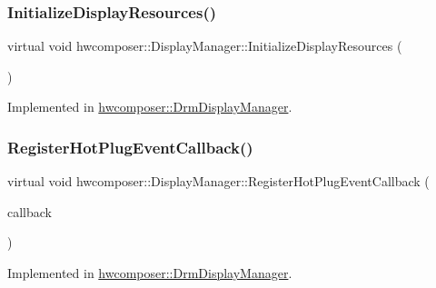 \subsubsection{\texorpdfstring{Initialize\+Display\+Resources()}{InitializeDisplayResources()}}
{\footnotesize\ttfamily virtual void hwcomposer\+::\+Display\+Manager\+::\+Initialize\+Display\+Resources (\begin{DoxyParamCaption}{ }\end{DoxyParamCaption})\hspace{0.3cm}{\ttfamily [pure virtual]}}



Implemented in \mbox{\hyperlink{classhwcomposer_1_1DrmDisplayManager_a775eee42523dabde8e4187770cbe9c6c}{hwcomposer\+::\+Drm\+Display\+Manager}}.

\mbox{\label{classhwcomposer_1_1DisplayManager_a2c1138176c411a5164052e83f623595d}} 
\subsubsection{\texorpdfstring{Register\+Hot\+Plug\+Event\+Callback()}{RegisterHotPlugEventCallback()}}
{\footnotesize\ttfamily virtual void hwcomposer\+::\+Display\+Manager\+::\+Register\+Hot\+Plug\+Event\+Callback (\begin{DoxyParamCaption}\item[{std\+::shared\+\_\+ptr$<$ \mbox{\hyperlink{classhwcomposer_1_1DisplayHotPlugEventCallback}{Display\+Hot\+Plug\+Event\+Callback}} $>$}]{callback }\end{DoxyParamCaption})\hspace{0.3cm}{\ttfamily [pure virtual]}}



Implemented in \mbox{\hyperlink{classhwcomposer_1_1DrmDisplayManager_ab11e4353cddc68652abcae61dd26027d}{hwcomposer\+::\+Drm\+Display\+Manager}}.

\mbox{\label{classhwcomposer_1_1DisplayManager_a9728735ff10a6e52861c4201bf8c6fb2}} 
